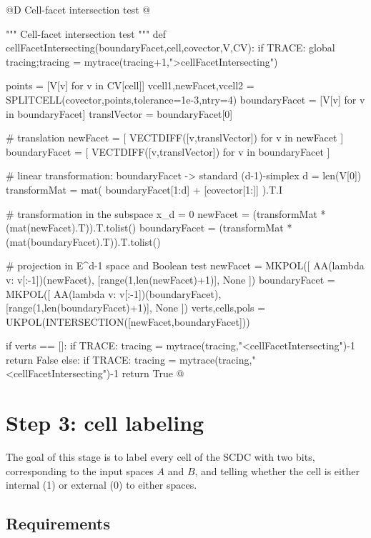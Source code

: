 \documentclass[11pt,oneside]{article}	%
\begin{document}
@D Cell-facet intersection test
@{""" Cell-facet intersection test """
def cellFacetIntersecting(boundaryFacet,cell,covector,V,CV):
	if TRACE: global tracing;tracing = mytrace(tracing+1,">cellFacetIntersecting")

	points = [V[v] for v in CV[cell]]
	vcell1,newFacet,vcell2 = SPLITCELL(covector,points,tolerance=1e-3,ntry=4)
	boundaryFacet = [V[v] for v in boundaryFacet]
	translVector = boundaryFacet[0]
	
	# translation 
	newFacet = [ VECTDIFF([v,translVector]) for v in newFacet ]
	boundaryFacet = [ VECTDIFF([v,translVector]) for v in boundaryFacet ]
	
	# linear transformation: boundaryFacet -> standard (d-1)-simplex
	d = len(V[0])
	transformMat = mat( boundaryFacet[1:d] + [covector[1:]] ).T.I
	
	# transformation in the subspace x_d = 0
	newFacet = (transformMat * (mat(newFacet).T)).T.tolist()
	boundaryFacet = (transformMat * (mat(boundaryFacet).T)).T.tolist()
	
	# projection in E^{d-1} space and Boolean test
	newFacet = MKPOL([ AA(lambda v: v[:-1])(newFacet), 
							[range(1,len(newFacet)+1)], None ])
	boundaryFacet = MKPOL([ AA(lambda v: v[:-1])(boundaryFacet), 
							[range(1,len(boundaryFacet)+1)], None ])
	verts,cells,pols = UKPOL(INTERSECTION([newFacet,boundaryFacet]))
	

	if verts == []: 
		if TRACE: tracing = mytrace(tracing,"<cellFacetIntersecting")-1
		return False
	else: 
		if TRACE: tracing = mytrace(tracing,"<cellFacetIntersecting")-1
		return True
@}








\section{Step 3: cell labeling}

The goal of this stage is to label every cell of the SCDC with two bits, corresponding to the input spaces $A$ and $B$, and telling whether the cell is either internal (1) or external (0) to either spaces.

\subsection{Requirements}
\end{document}
